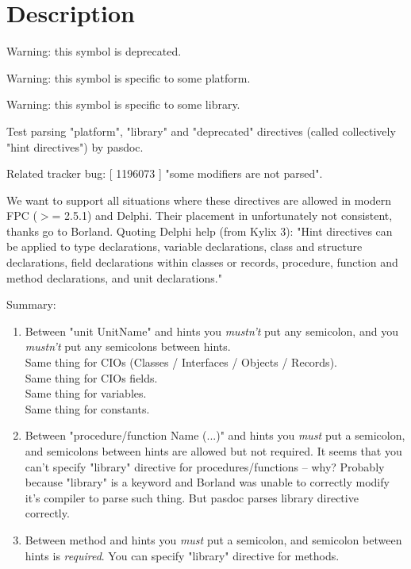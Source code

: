 \documentclass{report}
\begin{document}
\section{Description}
Warning: this symbol is deprecated.

Warning: this symbol is specific to some platform.

Warning: this symbol is specific to some library.

Test parsing "platform", "library" and "deprecated" directives (called collectively "hint directives") by pasdoc.\hfill\vspace*{1ex}



Related tracker bug: [ 1196073 ] "some modifiers are not parsed".

We want to support all situations where these directives are allowed in modern FPC ({$>$}= 2.5.1) and Delphi. Their placement in unfortunately not consistent, thanks go to Borland. Quoting Delphi help (from Kylix 3): "Hint directives can be applied to type declarations, variable declarations, class and structure declarations, field declarations within classes or records, procedure, function and method declarations, and unit declarations."

Summary:

\begin{enumerate}
\setcounter{enumi}{0} \setcounter{enumii}{0} \setcounter{enumiii}{0} \setcounter{enumiv}{0} 
\item  Between "unit UnitName" and hints you \textit{mustn't} put any semicolon, and you \textit{mustn't} put any semicolons between hints. \\{} Same thing for CIOs (Classes / Interfaces / Objects / Records). \\{} Same thing for CIOs fields. \\{} Same thing for variables. \\{} Same thing for constants.
\setcounter{enumi}{1} \setcounter{enumii}{1} \setcounter{enumiii}{1} \setcounter{enumiv}{1} 
\item  Between "procedure/function Name (...)" and hints you \textit{must} put a semicolon, and semicolons between hints are allowed but not required. It seems that you can't specify "library" directive for procedures/functions -- why? Probably because "library" is a keyword and Borland was unable to correctly modify it's compiler to parse such thing. But pasdoc parses library directive correctly.
\setcounter{enumi}{2} \setcounter{enumii}{2} \setcounter{enumiii}{2} \setcounter{enumiv}{2} 
\item  Between method and hints you \textit{must} put a semicolon, and semicolon between hints is \textit{required}. You can specify "library" directive for methods.
\end{enumerate}
\end{document}
